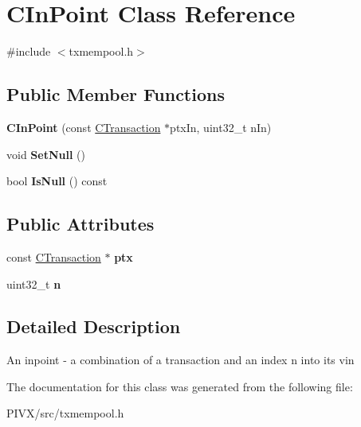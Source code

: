 \hypertarget{class_c_in_point}{}\section{C\+In\+Point Class Reference}
\label{class_c_in_point}


{\ttfamily \#include $<$txmempool.\+h$>$}

\subsection*{Public Member Functions}
\begin{DoxyCompactItemize}
\item 
\mbox{\label{class_c_in_point_aa1aafd0f20137bcf79302bdb51ea2a0a}} 
{\bfseries C\+In\+Point} (const \mbox{\hyperlink{class_c_transaction}{C\+Transaction}} $\ast$ptx\+In, uint32\+\_\+t n\+In)
\item 
\mbox{\label{class_c_in_point_af92945e76098bd920049f9f85a730e22}} 
void {\bfseries Set\+Null} ()
\item 
\mbox{\label{class_c_in_point_a959a51348c217c82773bbedee016af76}} 
bool {\bfseries Is\+Null} () const
\end{DoxyCompactItemize}
\subsection*{Public Attributes}
\begin{DoxyCompactItemize}
\item 
\mbox{\label{class_c_in_point_a76bf1c9b14d4ba95ff3e260cd47a9ce4}} 
const \mbox{\hyperlink{class_c_transaction}{C\+Transaction}} $\ast$ {\bfseries ptx}
\item 
\mbox{\label{class_c_in_point_a456e18a182bfa70cbf63d28561c3ae1c}} 
uint32\+\_\+t {\bfseries n}
\end{DoxyCompactItemize}


\subsection{Detailed Description}
An inpoint -\/ a combination of a transaction and an index n into its vin 

The documentation for this class was generated from the following file\+:\begin{DoxyCompactItemize}
\item 
P\+I\+V\+X/src/txmempool.\+h\end{DoxyCompactItemize}
